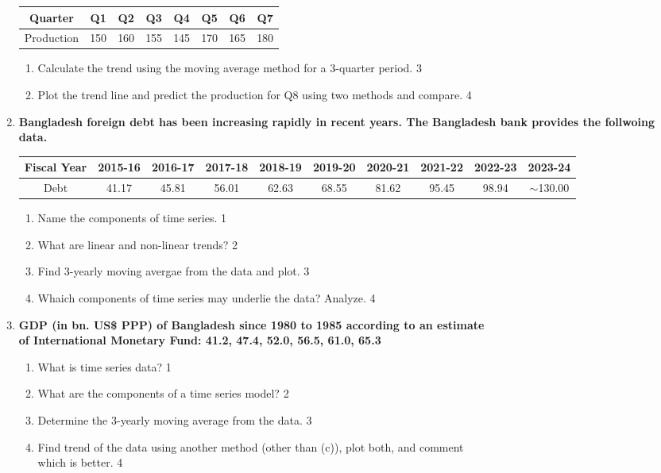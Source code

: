 \documentclass[a4paper,oneside]{book}
\begin{document}
\begin{enumerate}
\begin{table}[h]
\centering
\begin{tabular}{cccccccc}
Quarter    & Q1     & Q2     & Q3     & Q4     & Q5     & Q6     & Q7     \\ \hline
Production & 150    & 160    & 155    & 145    & 170    & 165    & 180    \\
\end{tabular}
\end{table}

\begin{enumerate}
\item
Calculate the trend using the moving average method for a 3-quarter period. \hfill 3
\item
Plot the trend line and predict the production for Q8 using two methods 
and compare. \hfill 4
\end{enumerate}


  
     \item
	  \textbf{Bangladesh foreign debt has been increasing rapidly in recent years. The Bangladesh bank provides the follwoing data.}
	  
	  \begin{table}[h]
	  \centering
\begin{tabular}{c|c|c|c|c|c|c|c|c|c}
Fiscal Year & 2015-16 & 2016-17 & 2017-18 & 2018-19 & 2019-20 & 2020-21 & 2021-22 & 2022-23 & 2023-24 \\ \hline
Debt & 41.17 & 45.81 & 56.01 & 62.63 & 68.55 & 81.62 & 95.45 & 98.94 & $\sim$130.00
\end{tabular}
\end{table}
  
  \begin{enumerate}
    \item
	Name the components of time series. \hfill 1
    \item
	What are linear and non-linear trends? \hfill 2
    \item  
	Find 3-yearly moving avergae from the data and plot. \hfill 3
    \item
	Whaich components of time series may underlie the data? Analyze. \hfill 4
  \end{enumerate}

 \item
	  \textbf{GDP (in bn. US\$ PPP) of Bangladesh since 1980 to 1985 according to an estimate \\ of International  Monetary Fund: 41.2, 47.4, 52.0, 56.5, 61.0, 65.3}
  \begin{enumerate}
    \item
	What is time series data? \hfill 1
    \item
	What are the components of a time series model? \hfill 2
    \item  
	Determine the 3-yearly moving average from the data. \hfill 3
    \item
	Find trend of the data using another method (other than (c)), plot both, and comment \\ which is better. \hfill 4
\end{enumerate}


\end{enumerate}
\end{document}
